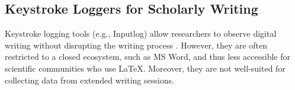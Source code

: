 



\subsection{Keystroke Loggers for Scholarly Writing}

Keystroke logging tools (e.g., Inputlog) allow researchers to observe digital writing without disrupting the writing process \cite{chan2017using, johansson2010looking, leijten2013keystroke, lindgren2019observing}. However, they are often restricted to a closed ecosystem, such as MS Word, and thus less accessible for scientific communities who use \LaTeX. Moreover, they are not well-suited for collecting data from extended writing sessions.

